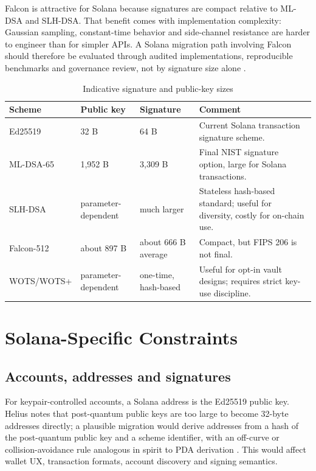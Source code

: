 \documentclass[11pt,a4paper,oneside,parskip=false]{scrartcl}
\begin{document}
Falcon is attractive for Solana because signatures are compact relative to ML-DSA and SLH-DSA. That benefit comes with implementation complexity: Gaussian sampling, constant-time behavior and side-channel resistance are harder to engineer than for simpler APIs. A Solana migration path involving Falcon should therefore be evaluated through audited implementations, reproducible benchmarks and governance review, not by signature size alone \cite{falcon-spec,jump-quantum-migration-paths}.

\begin{table}[htbp]
\centering
\caption{Indicative signature and public-key sizes}
\label{tab:scheme-sizes}
\small
\begin{tabularx}{\textwidth}{L{0.22\textwidth}L{0.20\textwidth}L{0.22\textwidth}Y}
\toprule
\textbf{Scheme} & \textbf{Public key} & \textbf{Signature} & \textbf{Comment} \\
\midrule
Ed25519 & 32 B & 64 B & Current Solana transaction signature scheme. \\
ML-DSA-65 & 1,952 B & 3,309 B & Final NIST signature option, large for Solana transactions. \\
SLH-DSA & parameter-dependent & much larger & Stateless hash-based standard; useful for diversity, costly for on-chain use. \\
Falcon-512 & about 897 B & about 666 B average & Compact, but FIPS 206 is not final. \\
WOTS/WOTS+ & parameter-dependent & one-time, hash-based & Useful for opt-in vault designs; requires strict key-use discipline. \\
\bottomrule
\end{tabularx}
\end{table}

\section{Solana-Specific Constraints}

\subsection{Accounts, addresses and signatures}

For keypair-controlled accounts, a Solana address is the Ed25519 public key. Helius notes that post-quantum public keys are too large to become 32-byte addresses directly; a plausible migration would derive addresses from a hash of the post-quantum public key and a scheme identifier, with an off-curve or collision-avoidance rule analogous in spirit to PDA derivation \cite{helius-solana-pq}. This would affect wallet UX, transaction formats, account discovery and signing semantics.
\end{document}
